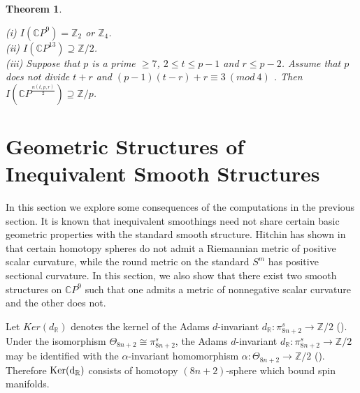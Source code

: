 \documentclass[a4paper,leqno,12pt]{amsart}
\theoremstyle{plain}
\newtheorem{theorem}{Theorem}[section]
\theoremstyle{definition}
\numberwithin{equation}{section}
\begin{document}
\begin{theorem}\label{inersumm}

(i) $I(\mathbb{C}P^{9})=\mathbb{Z}_2$ or $\mathbb{Z}_4$.\\
(ii) $I(\mathbb{C}P^{13})\supseteq {\mathbb{Z}}/2$.\\
(iii) Suppose that $p$ is a prime $\geq 7$, $2\leq t \leq p-1$ and $r\leq p-2$. Assume that $p$ does not divide $t+r$ and $(p-1)(t-r) + r \equiv 3~(\mathit{mod}~4)$ . Then $I({\mathbb{C}} P^\frac{n(t,p,r)}{2})\supseteq {\mathbb{Z}}/p$.

\end{theorem}

\section{Geometric Structures of Inequivalent Smooth Structures}
In this section we explore some consequences of the computations in the previous section. It is known that inequivalent smoothings need not share certain basic geometric
properties with the standard smooth structure. Hitchin has shown in \cite{Hit74} that certain homotopy spheres do not admit a Riemannian metric of positive scalar curvature, while the round metric on the standard $S^m$ has positive sectional curvature. In this section, we also show that there exist two smooth structures on $\mathbb{C} P^{9}$ such that one admits a metric of nonnegative scalar curvature and the other does not. 

 Let ${\mathit{Ker}}(d_{\mathbb{R}})$ denotes the kernel of the Adams $d$-invariant $d_{\mathbb{R}} : \pi_{8n+2}^{s}\to \mathbb{Z}/2$ (\cite{Ada}). Under the isomorphism $\Theta_{8n+2}\cong \pi_{8n+2}^{s}$, the Adams $d$-invariant $d_{\mathbb{R}} : \pi_{8n+2}^{s}\to \mathbb{Z}/2$ may be identified with the $\alpha$-invariant homomorphism $\alpha:\Theta_{8n+2}\to \mathbb{Z}/2$ (\cite{Hit74}).  Therefore $\rm{Ker}(d_{\mathbb{R}})$ consists of homotopy $(8n+2)$-sphere which bound spin manifolds.
\end{document}
